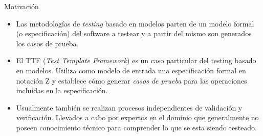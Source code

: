 \documentclass{beamer}
\begin{document}
\begin{frame}{Motivación}{}
  \begin{itemize}

  \item {
    Las metodologías de \emph{testing} basado en modelos parten de un modelo formal (o especificación) del software a testear y a partir del mismo son generados los casos de prueba. 
  }


  \item {
    El TTF (\emph{Test Template Framework}) es un caso particular del testing basado en modelos. Utiliza como modelo de entrada una especificación formal en notación Z y establece cómo generar \emph{casos de prueba} para las operaciones incluidas en la especificación.

  }


  \item {
    Usualmente también se realizan procesos independientes de validación y verificación. Llevados a cabo por expertos en el dominio que generalmente no poseen conocimiento técnico para comprender lo que se esta siendo testeado.
  }


  \end{itemize}
\end{frame}
\end{document}
